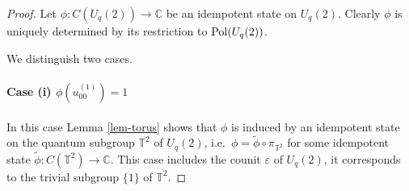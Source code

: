 \documentclass[12pt]{amsart}
\theoremstyle{definition}
\theoremstyle{remark}
\numberwithin{equation}{section}
\begin{document}
\begin{proof} 
Let $\phi:C(U_q(2))\to \mathbb{C}$ be an idempotent state on $U_q(2)$. Clearly
$\phi$ is uniquely determined by its restriction to ${\rm Pol}(U_q(2))$.

We distinguish two cases.

\paragraph{Case (i) $\phi(u^{(1)}_{00})=1$}
In this case Lemma \ref{lem-torus} shows that $\phi$ is induced by an idempotent
state on the quantum subgroup $\mathbb{T}^2$ of $U_q(2)$, i.e.\
$\phi=\tilde{\phi}\circ\pi_{\mathbb{T}^2}$ for some idempotent state
$\tilde{\phi}:C(\mathbb{T}^2)\to\mathbb{C}$. This case includes the counit
$\varepsilon$ of $U_q(2)$, it corresponds to the trivial subgroup $\{1\}$ of
$\mathbb{T}^2$.


\end{proof}
\end{document}
